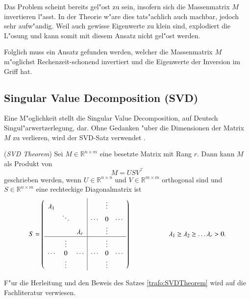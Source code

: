 \begin{refsection}
Das Problem scheint bereits gel"ost zu sein, insofern sich die Massenmatrix $M$ invertieren l"asst. In der Theorie w"are dies tats"achlich auch machbar, jedoch sehr aufw"andig. Weil auch gewisse Eigenwerte zu klein sind, explodiert die L"osung und kann somit mit diesem Ansatz nicht gel"ost werden.

Folglich muss ein Ansatz gefunden werden, welcher die Massenmatrix $M$ m"oglichst Rechenzeit-schonend invertiert und die Eigenwerte der Inversion im Griff hat. 


\subsection{Singular Value Decomposition (SVD) }
Eine M"oglichkeit stellt die Singular Value Decomposition, auf Deutsch Singul"arwertzerlegung, dar. Ohne Gedanken "uber die Dimensionen der Matrix $M$ zu verlieren, wird der SVD-Satz verwendet \cite{trafo:Watkins}. 

\begin{satz}
	\label{trafo:SVDTheorem}
	(\textit{SVD Theorem}) Sei $M\in \mathbb{R}^{n \times m}$ eine besetzte Matrix mit Rang $r$. Dann kann $M$ als Produkt von
	\begin{equation}
		M = USV^\top
	\end{equation} 
	geschrieben werden, wenn $U \in \mathbb{R}^{n \times n}$ und $V \in \mathbb{R}^{m \times m}$ orthogonal sind und $S \in \mathbb{R}^{n \times m}$ eine rechteckige Diagonalmatrix ist 
	\begin{equation*}
		S = \left( 
			\begin{array}{ccc|ccc}
				\lambda_1 &          &          &        & \vdots &        \\
				& \ddots   &          & \cdots & 0      & \cdots \\
				&          & \lambda_r &        & \vdots &        \\
				\hline
				&  \vdots  &          &        & \vdots &        \\
				\cdots   &  0       & \cdots   & \cdots & 0      & \cdots \\
				&  \vdots  &          &        & \vdots &   \\				
				\end{array}
			\right) 
			\hspace{2cm}\lambda_1 \geq \lambda_2 \geq \dots \lambda_r > 0. 
	\end{equation*}
\end{satz}
F"ur die Herleitung und den Beweis des Satzes \ref{trafo:SVDTheorem} wird auf die Fachliteratur verwiesen.


\end{refsection}

